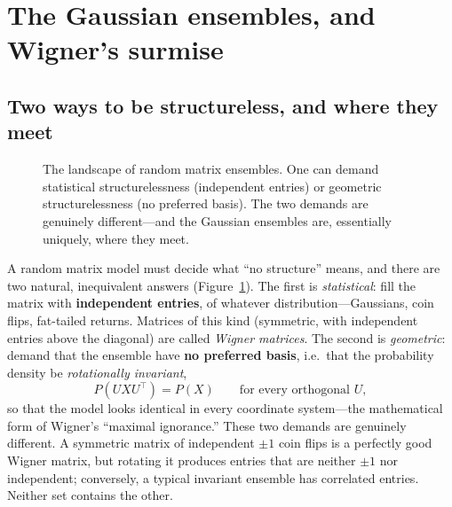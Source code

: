 \documentclass[11pt]{article}
\begin{document}
\section{The Gaussian ensembles, and Wigner's surmise}
\label{sec:wigner}

\subsection{Two ways to be structureless, and where they meet}
\label{sec:ensembles}

\begin{figure}[t]
\centering
{}
\caption{The landscape of random matrix ensembles. One can demand
statistical structurelessness (independent entries) or geometric
structurelessness (no preferred basis). The two demands are genuinely
different---and the Gaussian ensembles are, essentially uniquely, where
they meet.}
\label{fig:venn}
\end{figure}

A random matrix model must decide what ``no structure'' means, and there
are two natural, inequivalent answers (Figure~\ref{fig:venn}). The first
is \emph{statistical}: fill the matrix with \textbf{independent entries},
of whatever distribution---Gaussians, coin flips, fat-tailed returns.
Matrices of this kind (symmetric, with independent entries above the
diagonal) are called \emph{Wigner matrices}. The second is
\emph{geometric}: demand that the ensemble have \textbf{no preferred
basis}, i.e.\ that the probability density be \emph{rotationally
invariant},
\[
P(UXU^{\top})=P(X)\qquad\text{for every orthogonal }U,
\]
so that the model looks identical in every coordinate system---the
mathematical form of Wigner's ``maximal ignorance.'' These two demands
are genuinely different. A symmetric matrix of independent $\pm1$ coin
flips is a perfectly good Wigner matrix, but rotating it produces entries
that are neither $\pm1$ nor independent; conversely, a typical invariant
ensemble has correlated entries. Neither set contains the other.
\end{document}
